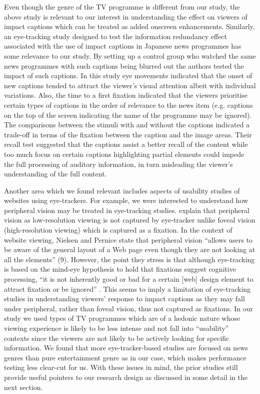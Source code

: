 \documentclass[output=paper]{langsci/langscibook}
\begin{document}
Even though the genre of the TV programme is different from our study, the above study is relevant to our interest in understanding the effect on viewers of impact captions which can be treated as added onscreen enhancements. Similarly, an eye-tracking study \citep{Matsukawa2009} designed to test the information redundancy effect associated with the use of impact captions in Japanese news programmes has some relevance to our study.  By setting up a control group who watched the same news programmes with such captions being blurred out the authors tested the impact of such captions.  In this study eye movements indicated that the onset of new captions tended to attract the viewer's visual attention albeit with individual variations. Also, the time to a first fixation indicated that the viewers prioritise certain types of captions in the order of relevance to the news item (e.g. captions on the top of the screen indicating the name of the programme may be ignored). The comparisons between the stimuli with and without the captions indicated a trade-off in terms of the fixation between the caption and the image areas. Their recall test suggested that the captions assist a better recall of the content while too much focus on certain captions highlighting partial elements could impede the full processing of auditory information, in turn misleading the viewer's understanding of the full content.       


\largerpage
Another area which we found relevant includes aspects of usability studies of websites using eye-trackers. For example, we were interested to understand how peripheral vision may be treated in eye-tracking studies.  \citet[6--7]{Nielsen2010} explain that peripheral vision as low-resolution viewing is not captured by eye-tracker unlike foveal vision (high-resolution viewing) which is captured as a fixation.  In the context of website viewing, Nielsen and Pernice state that peripheral vision ``allows users to be aware of the general layout of a Web page even though they are not looking at all the elements'' (9). However, the point they stress is that although eye-tracking is based on the mind-eye hypothesis to hold that fixations suggest cognitive processing, ``it is not inherently good or bad for a certain [web] design element to attract fixation or be ignored'' \citep[10]{Nielsen2010}.  This seems to imply a limitation of eye-tracking studies in understanding viewers' response to impact captions as they may fall under peripheral, rather than foveal vision, thus not captured as fixations. In our study we used types of TV programmes which are of a hedonic nature whose viewing experience is likely to be less intense and not fall into ``usability'' contexts since the viewers are not likely to be actively looking for specific information.  We found that more eye-tracker-based studies are focused on news genres than pure entertainment genre as in our case, which makes performance testing less clear-cut for us.  With these issues in mind, the prior studies still provide useful pointers to our research design as discussed in some detail in the next section. 
\end{document}
